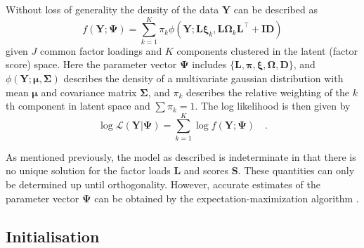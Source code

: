 \documentclass[twocolumn]{aastex61}
\newcommand{\vect}[1]{\boldsymbol{\mathbf{#1}}}
\renewcommand{\vec}[1]{\vect{#1}}
\newcommand{\weight}{\pi}
\newcommand{\data}{\textbf{Y}}
\newcommand{\vecdata}{\vec\data}
\newcommand{\transpose}{^\intercal}
\newcommand{\eye}{\textbf{I}}
\newcommand{\factorloads}{\textbf{L}}
\newcommand{\factorscores}{\textbf{S}}
\newcommand{\specificvariance}{\vec{D}}
\newcommand{\scoremeans}{\vec\xi}
\newcommand{\scorecovs}{\vec\Omega}
\newcommand{\NumLatentFactors}{J}
\newcommand{\NumComponents}{K}
\newcommand{\numcomponents}{k}
\begin{document}
Without loss of generality the density of the data $\vecdata$ can be described as
\begin{equation}
	f(\vecdata; \vec\Psi) = \sum_{\numcomponents=1}^{\NumComponents}\weight_\numcomponents\phi(\vecdata;\factorloads\scoremeans_\numcomponents, \factorloads\scorecovs_\numcomponents\factorloads\transpose + \eye\specificvariance)
\end{equation}
\noindent{}given $\NumLatentFactors$ common factor loadings and $\NumComponents$ components
clustered in the latent (factor score) space. Here the parameter
vector
$\vec\Psi$ includes $\{\factorloads,\vec\pi,\scoremeans,\scorecovs,\specificvariance\}$, and $\phi(\vecdata;\vec\mu, \vec\Sigma)$
describes the density of a multivariate gaussian distribution with
mean $\vec\mu$ and covariance matrix $\vec\Sigma$,
and $\weight_\numcomponents$ describes the relative weighting of the $\numcomponents$th
component in latent space and $\sum\weight_\numcomponents = 1$.
The log likelihood is then given by
\begin{equation}
	\log\mathcal{L}(\vecdata|\vec\Psi) = \sum_{\numcomponents=1}^{\NumComponents}\log{f(\vecdata;\vec\Psi)} \quad .
\end{equation}


As mentioned previously, the model as described is indeterminate in that
there is no unique solution for the factor loads $\factorloads$ and scores
$\factorscores$. These quantities can only be determined up until 
orthogonality. However, accurate estimates of the parameter vector $\vec\Psi$
can be obtained by the expectation-maximization algorithm \citep{EM}.



\subsection{Initialisation}
\end{document}
